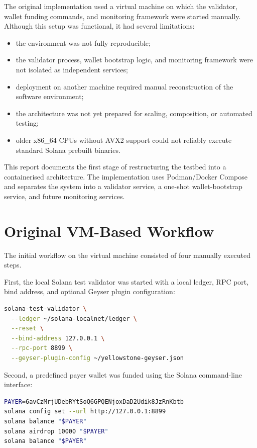 \documentclass[11pt,a4paper]{article}
\begin{document}
The original implementation used a virtual machine on which the validator, wallet funding commands, and monitoring framework were started manually. Although this setup was functional, it had several limitations:

\begin{itemize}[leftmargin=2em]
  \item the environment was not fully reproducible;
  \item the validator process, wallet bootstrap logic, and monitoring framework were not isolated as independent services;
  \item deployment on another machine required manual reconstruction of the software environment;
  \item the architecture was not yet prepared for scaling, composition, or automated testing;
  \item older x86\_64 CPUs without AVX2 support could not reliably execute standard Solana prebuilt binaries.
\end{itemize}

This report documents the first stage of restructuring the testbed into a containerised architecture. The implementation uses Podman/Docker Compose and separates the system into a validator service, a one-shot wallet-bootstrap service, and future monitoring services.

\section{Original VM-Based Workflow}

The initial workflow on the virtual machine consisted of four manually executed steps.

First, the local Solana test validator was started with a local ledger, RPC port, bind address, and optional Geyser plugin configuration:

\begin{lstlisting}[language=bash]
solana-test-validator \
  --ledger ~/solana-localnet/ledger \
  --reset \
  --bind-address 127.0.0.1 \
  --rpc-port 8899 \
  --geyser-plugin-config ~/yellowstone-geyser.json
\end{lstlisting}

Second, a predefined payer wallet was funded using the Solana command-line interface:

\begin{lstlisting}[language=bash]
PAYER=6avCzMrjUDebRYtSoQ6GPQENjoxDaD2Udik8JzRnKbtb
solana config set --url http://127.0.0.1:8899
solana balance "$PAYER"
solana airdrop 10000 "$PAYER"
solana balance "$PAYER"
\end{lstlisting}
\end{document}
